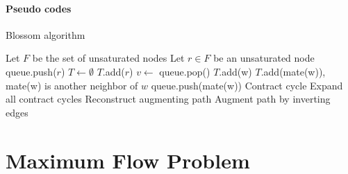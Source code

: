                 \paragraph{Pseudo codes}
                    \begin{algorithm}
                        \centering
                        \caption{Blossom algorithm}
                        \begin{algorithmic}
                            \State Let $F$ be the set of unsaturated nodes
                                \State Let $r \in F$ be an unsaturated node
                                \State queue.push($r$)
                                \State $T \gets \emptyset$
                                \State $T$.add($r$)
                                    \State $v \gets$ queue.pop()
                                            \State $T$.add(w)
                                            \State $T$.add(mate(w)), mate(w) is another neighbor of $w$
                                            \State queue.push(mate(w))
                                            \State Contract cycle
                                            \State Expand all contract cycles
                                            \State Reconstruct augmenting path
                                            \State Augment path by inverting edges
                                        \EndIf
                                    \EndFor
                                \EndWhile
                            \EndWhile
                        \end{algorithmic}
                    \end{algorithm}    

        \section{Maximum Flow Problem}
